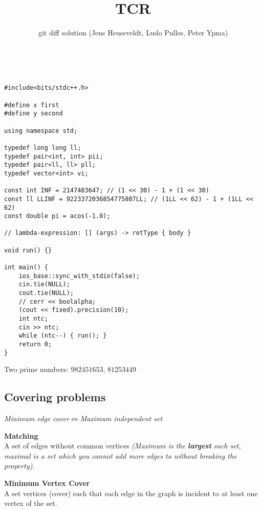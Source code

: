 \documentclass{article}
\title{TCR}
\author{git diff solution (Jens Heuseveldt, Ludo Pulles, Peter Ypma)}
\begin{document}
\begin{center}
	\makeatletter
	\textbf{\@title} \\
	\emph{\@author}
	\makeatother
\end{center}

\tableofcontents

\newpage

\begin{lstlisting}
#include<bits/stdc++.h>

#define x first
#define y second

using namespace std;

typedef long long ll;
typedef pair<int, int> pii;
typedef pair<ll, ll> pll;
typedef vector<int> vi;

const int INF = 2147483647; // (1 << 30) - 1 + (1 << 30)
const ll LLINF = 9223372036854775807LL; // (1LL << 62) - 1 + (1LL << 62)
const double pi = acos(-1.0);

// lambda-expression: [] (args) -> retType { body }

void run() {}

int main() {
	ios_base::sync_with_stdio(false);
	cin.tie(NULL);
	cout.tie(NULL);
	// cerr << boolalpha;
	(cout << fixed).precision(10);
	int ntc;
	cin >> ntc;
	while (ntc--) { run(); }
	return 0;
}

\end{lstlisting}

Two prime numbers: $\mathit{982451653}$, $\mathit{81253449}$

\subsection{Covering problems}

\begin{center}
	\emph{Minimum edge cover$\iff$Maximum independent set}
\end{center}

\textbf{Matching} \\
A set of edges without common vertices \textit{(Maximum is the \textbf{largest} such set, maximal is a set which you cannot add more edges to without breaking the property)}.

\textbf{Minimum Vertex Cover} \\
A set vertices (cover) such that each edge in the graph is incident to at least one vertex of the set.
\end{document}
